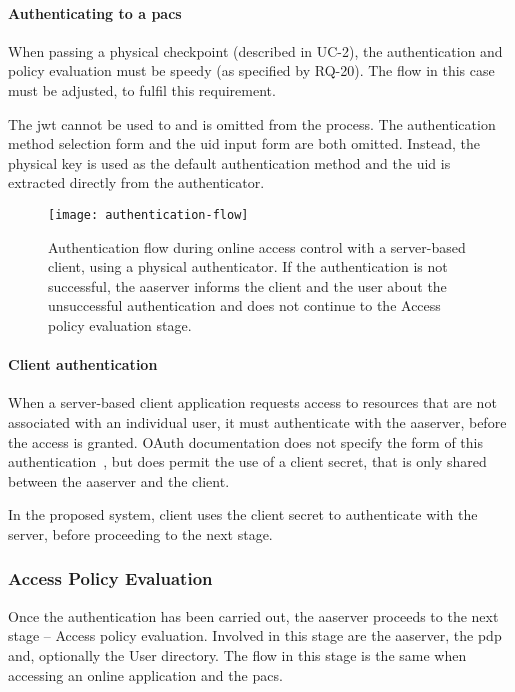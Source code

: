 \paragraph{Authenticating to a \acrshort{pacs}} 
When passing a physical checkpoint (described in UC-2), the authentication and policy evaluation must be speedy (as specified by RQ-20). The flow in this case must be adjusted, to fulfil this requirement.

The \acrshort{jwt} cannot be used to and is omitted from the process. The authentication method selection form and the \acrshort{uid} input form are both omitted. Instead, the physical key is used as the default authentication method and the \acrshort{uid} is extracted directly from the authenticator.

\begin{sidewaysfigure}[p]
    \centering
    \texttt{[image: authentication-flow]}
    \caption{Authentication flow during online access control with a server-based client, using a physical authenticator. If the authentication is not successful, the \acrshort{aaserver} informs the client and the user about the unsuccessful authentication and does not continue to the Access policy evaluation stage.}
    \label{fig:authentication-flow}
\end{sidewaysfigure}

\paragraph{Client authentication}
When a server-based client application requests access to resources that are not associated with an individual user, it must authenticate with the \acrshort{aaserver}, before the access is granted. OAuth documentation does not specify the form of this authentication~\cite{Hardt2012TheFramework}, but does permit the use of a client secret, that is only shared between the \acrshort{aaserver} and the client.

In the proposed system, client uses the client secret to authenticate with the server, before proceeding to the next stage.

\subsubsection{Access Policy Evaluation}
Once the authentication has been carried out, the \acrshort{aaserver} proceeds to the next stage -- Access policy evaluation. Involved in this stage are the \acrshort{aaserver}, the \acrshort{pdp} and, optionally the User directory. The flow in this stage is the same when accessing an online application and the \acrshort{pacs}.

